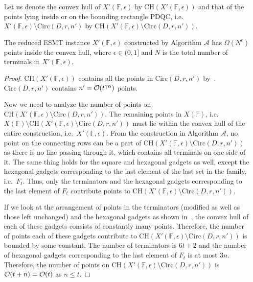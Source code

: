 Let us denote the convex hull of $X'(\mathbb{F},\epsilon)$ by $\mathrm{CH}(X'(\mathbb{F},\epsilon))$ and that of the points lying inside or on the bounding rectangle $\mathrm{PDQC}$, i.e.~$X'(\mathbb{F},\epsilon)\setminus \mathrm{Circ}(D,r,n')$ by $\mathrm{CH}(X'(\mathbb{F},\epsilon)\setminus \mathrm{Circ}(D,r,n'))$.

\begin{lemma}\label{lem:redcn_size}
    The reduced ESMT instance $X'(\mathbb{F},\epsilon)$ constructed by Algorithm $\mathcal{A}$ has $\Omega (N^\epsilon)$ points inside the convex hull, where $\epsilon \in (0,1]$ and $N$ is the total number of terminals in $X'(\mathbb{F},\epsilon)$. 
\end{lemma}

\begin{proof}
    $\mathrm{CH}(X'(\mathbb{F},\epsilon))$ contains all the points in $\mathrm{Circ}(D,r,n')$ by~. $\mathrm{Circ}(D,r,n')$ contains $n' = \mathcal{O}(t^{\gamma\alpha})$ points.

    Now we need to analyze the number of points on $\mathrm{CH}(X'(\mathbb{F},\epsilon)\setminus \mathrm{Circ}(D,r,n'))$. The remaining points in $X(\mathbb{F})$, i.e.~$X(\mathbb{F})\setminus \mathrm{CH}(X'(\mathbb{F},\epsilon)\setminus \mathrm{Circ}(D,r,n'))$ must lie within the convex hull of the entire construction, i.e.~$X'(\mathbb{F},\epsilon)$. From the construction in Algorithm $\mathcal{A}$, no point on the connecting rows can be a part of $\mathrm{CH}(X'(\mathbb{F},\epsilon)\setminus \mathrm{Circ}(D,r,n'))$ as there is no line passing through it, which contains all terminals on one side of it. The same thing holds for the square and hexagonal gadgets as well, except the hexagonal gadgets corresponding to the last element of the last set in the family, i.e.~$F_t$. Thus, only the terminators and the hexagonal gadgets corresponding to the last element of $F_t$ contribute points to $\mathrm{CH}(X'(\mathbb{F},\epsilon)\setminus \mathrm{Circ}(D,r,n'))$.

    If we look at the arrangement of points in the terminators (modified as well as those left unchanged) and the hexagonal gadgets as shown in~, the convex hull of each of these gadgets consists of constantly many points. Therefore, the number of points each of these gadgets contribute to $\mathrm{CH}(X'(\mathbb{F},\epsilon)\setminus \mathrm{Circ}(D,r,n'))$ is bounded by some constant. The number of terminators is $6t+2$ and the number of hexagonal gadgets corresponding to the last element of $F_t$ is at most $3n$. Therefore, the number of points on $\mathrm{CH}(X'(\mathbb{F},\epsilon)\setminus \mathrm{Circ}(D,r,n'))$ is $\mathcal{O}(t+n) = \mathcal{O}(t)$ as $n \leq t$.
    

\end{proof}
